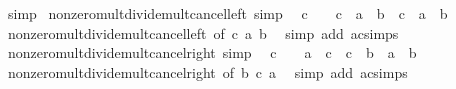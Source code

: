 \begin{isabellebody}
\ simp%
\endisatagproof
{\isafoldproof}%
%
\isadelimproof
\isanewline
%
\endisadelimproof
\isanewline
{}\isamarkupfalse%
\ nonzero{\isacharunderscore}{\kern0pt}mult{\isacharunderscore}{\kern0pt}divide{\isacharunderscore}{\kern0pt}mult{\isacharunderscore}{\kern0pt}cancel{\isacharunderscore}{\kern0pt}left{}\ {\isacharbrackleft}{\kern0pt}simp{\isacharbrackright}{\kern0pt}{\isacharcolon}{\kern0pt}\isanewline
\ \ {\isachardoublequoteopen}c\ {\isasymnoteq}\ {}\ {\isasymLongrightarrow}\ {\isacharparenleft}{\kern0pt}c\ {\isacharasterisk}{\kern0pt}\ a{\isacharparenright}{\kern0pt}\ {\isacharslash}{\kern0pt}\ {\isacharparenleft}{\kern0pt}b\ {\isacharasterisk}{\kern0pt}\ c{\isacharparenright}{\kern0pt}\ {\isacharequal}{\kern0pt}\ a\ {\isacharslash}{\kern0pt}\ b{\isachardoublequoteclose}\isanewline
%
\isadelimproof
\ \ %
\endisadelimproof
%
\isatagproof
{}\isamarkupfalse%
\ nonzero{\isacharunderscore}{\kern0pt}mult{\isacharunderscore}{\kern0pt}divide{\isacharunderscore}{\kern0pt}mult{\isacharunderscore}{\kern0pt}cancel{\isacharunderscore}{\kern0pt}left\ {\isacharbrackleft}{\kern0pt}of\ c\ a\ b{\isacharbrackright}{\kern0pt}\ \isamarkupfalse%
\ {\isacharparenleft}{\kern0pt}simp\ add{\isacharcolon}{\kern0pt}\ ac{\isacharunderscore}{\kern0pt}simps{\isacharparenright}{\kern0pt}%
\endisatagproof
{\isafoldproof}%
%
\isadelimproof
\isanewline
%
\endisadelimproof
\isanewline
{}\isamarkupfalse%
\ nonzero{\isacharunderscore}{\kern0pt}mult{\isacharunderscore}{\kern0pt}divide{\isacharunderscore}{\kern0pt}mult{\isacharunderscore}{\kern0pt}cancel{\isacharunderscore}{\kern0pt}right{}\ {\isacharbrackleft}{\kern0pt}simp{\isacharbrackright}{\kern0pt}{\isacharcolon}{\kern0pt}\isanewline
\ \ {\isachardoublequoteopen}c\ {\isasymnoteq}\ {}\ {\isasymLongrightarrow}\ {\isacharparenleft}{\kern0pt}a\ {\isacharasterisk}{\kern0pt}\ c{\isacharparenright}{\kern0pt}\ {\isacharslash}{\kern0pt}\ {\isacharparenleft}{\kern0pt}c\ {\isacharasterisk}{\kern0pt}\ b{\isacharparenright}{\kern0pt}\ {\isacharequal}{\kern0pt}\ a\ {\isacharslash}{\kern0pt}\ b{\isachardoublequoteclose}\isanewline
%
\isadelimproof
\ \ %
\endisadelimproof
%
\isatagproof
{}\isamarkupfalse%
\ nonzero{\isacharunderscore}{\kern0pt}mult{\isacharunderscore}{\kern0pt}divide{\isacharunderscore}{\kern0pt}mult{\isacharunderscore}{\kern0pt}cancel{\isacharunderscore}{\kern0pt}right\ {\isacharbrackleft}{\kern0pt}of\ b\ c\ a{\isacharbrackright}{\kern0pt}\ \isamarkupfalse%
\ {\isacharparenleft}{\kern0pt}simp\ add{\isacharcolon}{\kern0pt}\ ac{\isacharunderscore}{\kern0pt}simps{\isacharparenright}{\kern0pt}%

\end{isabellebody}

